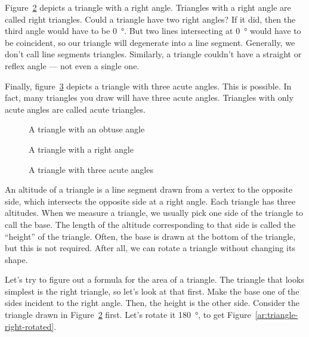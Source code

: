\documentclass[a4paper,10pt]{report}
\begin{document}
Figure~\ref{ar:triangle-right} depicts a triangle with a right angle. Triangles
with a right angle are called \glspl{right triangle}. Could a triangle have two
right angles? If it did, then the third angle would have to be \SI{0}{\degree}.
But two lines intersecting at \SI{0}{\degree} would have to be coincident, so
our triangle will degenerate into a line segment. Generally, we don't call line
segments triangles. Similarly, a triangle couldn't have a straight or reflex
angle --- not even a single one.

Finally, figure~\ref{ar:triangle-acute} depicts a triangle with three acute
angles. This is possible. In fact, many triangles you draw will have three
acute angles. Triangles with only acute angles are called acute triangles.

\begin{figure}

  \caption{A triangle with an obtuse angle}
  \label{ar:triangle-obtuse}
\end{figure}

\begin{figure}

  \caption{A triangle with a right angle}
  \label{ar:triangle-right}
\end{figure}

\begin{figure}

  \caption{A triangle with three acute angles}
  \label{ar:triangle-acute}
\end{figure}

An altitude of a triangle is a line segment drawn from a vertex to the opposite
side, which intersects the opposite side at a right angle. Each triangle has
three altitudes. When we measure a triangle, we usually pick one side of the
triangle to call the base. The length of the altitude corresponding to that
side is called the ``height'' of the triangle. Often, the base is drawn at the
bottom of the triangle, but this is not required. After all, we can rotate a
triangle without changing its shape.

Let's try to figure out a formula for the area of a triangle. The triangle that
looks simplest is the right triangle, so let's look at that first. Make the
base one of the sides incident to the right angle. Then, the height is the
other side. Consider the triangle drawn in Figure~\ref{ar:triangle-right}
first. Let's rotate it \SI{180}{\degree}, to get
Figure~\ref{ar:triangle-right-rotated}.
\end{document}

